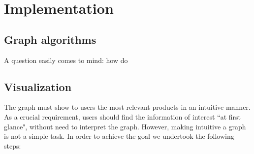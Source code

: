 \documentclass[a4paper,12pt]{article}
\begin{document}
\section{Implementation}


\subsection{Graph algorithms}
A question easily comes to mind: how do 


\subsection{Visualization}
The graph must show to users the most relevant products in an intuitive manner. As a crucial requirement, users should find the information of interest ``at first glance", without need to interpret the graph. However, making intuitive a graph is not a simple task. In order to achieve the goal we undertook the following steps:
\end{document}
